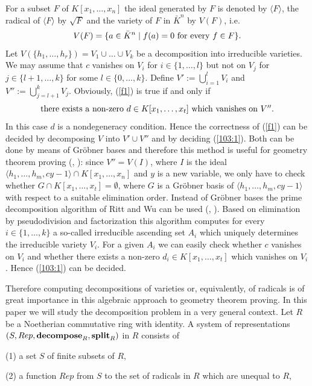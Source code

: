 \medskip
For a subset $F$ of $K[x_1,\ldots,x_n]$ the ideal generated by $F$ is denoted
by $\langle F\rangle$, the 
radical of $\langle F\rangle$ by $\sqrt{F}$ 
and the variety of $F$ in ${\bar K}^n$ by
$V(F)$, i.e.
\[ V(F)=\{a\in {\bar K}^n\mid f(a)=0 \hbox{ for every } f\in F\}. \]
Let $V(\{h_1,\ldots,h_r\})=V_1\cup\ldots\cup V_k$ be a decomposition 
into irreducible varieties. We may assume that 
$c$ vanishes on $V_i$ for $i\in\{1,\ldots,l\}$ but not on
$V_j$ for $j\in\{l+1,\ldots,k\}$
for some $l\in\{0,\ldots,k\}$. Define $V':=\bigcup_{i=1}^l V_i$ and 
$V'':=\bigcup_{j=l+1}^k V_j$. Obviously, (\ref{f1}) is true if and only if 
\begin{equation}
\hbox{there exists a non-zero $d\in K[x_1,\ldots,x_t]$ which vanishes on 
$V''$.} \label{103:1}
\end{equation}
In this case $d$ is a nondegeneracy condition. Hence 
the correctness of (\ref{f1}) can be decided by decomposing $V$ into
$V'\cup V''$ and by deciding (\ref{103:1}). 
Both can be done by means of Gr\"obner bases 
and therefore this method is useful for geometry theorem proving
(\cite{Kapu86a}, \cite{ChSc86}):
since $V''=V(I)$, where $I$ is the ideal 
$\langle h_1,\ldots,h_m,cy-1\rangle\cap K[x_1,\ldots,x_n]$
and $y$ is a new variable, we only 
have to check whether $G\cap K[x_1,\ldots,x_t]=\emptyset$, where $G$ is
a Gr\"obner basis of $\langle h_1,\ldots,h_m,cy-1\rangle$ with
respect to a suitable elimination order. 
Instead of Gr\"obner bases the prime decomposition algorithm of Ritt and Wu
can be used (\cite{Ritt50}, \cite{Wu84}).
Based on elimination by pseudodivision and factorization this algorithm
computes for every $i\in\{1,\ldots,k\}$ a so-called irreducible ascending
set $A_i$ which uniquely determines the irreducible variety $V_i$.
For a given $A_i$ we can easily check whether  
$c$ vanishes on $V_i$ and whether there exists a non-zero 
$d_i\in K[x_1,\ldots,x_t]$ which vanishes on $V_i$. Hence
(\ref{103:1}) can be decided.

Therefore computing decompositions of varieties or, equivalently, of radicals
is of great importance in this algebraic approach to
geometry theorem proving.
In this paper
we will
study the decomposition problem in a very general context.
Let $R$ be a
Noetherian commutative ring with identity. 
A system of representations $(S,Rep,{\bf decompose}_R,{\bf split}_R)$ in $R$
consists of

\smallskip
\noindent
(1) a set $S$ of finite subsets of $R$, 

\noindent
(2) a function $Rep$
from $S$ to the set of radicals in $R$ which are unequal to $R$, 

